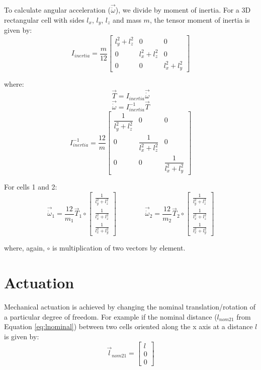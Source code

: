 {To calculate angular acceleration ($\vec{\dot{\omega}}$), we divide by moment of inertia.  For a 3D rectangular cell with sides $l_x$, $l_y$, $l_z$ and mass $m$, the tensor moment of inertia is given by:
\[ I_{inertia} = \dfrac{m}{12} \left[ \begin{array}{ccc}
l_y^2+l_z^2 & 0 & 0\\
0 & l_x^2+l_z^2 & 0\\
0 & 0 & l_x^2+l_y^2
 \end{array} \right] \]
 
 where:
 \[ \vec{T} = I_{inertia}\vec{\dot{\omega}} \]
  \[ \vec{\dot{\omega}}  = I_{inertia}^{-1}\vec{T} \]
  \[ I_{inertia}^{-1} = \dfrac{12}{m} \left[ \begin{array}{ccc}
\dfrac{1}{l_y^2+l_z^2} & 0 & 0\\
0 & \dfrac{1}{l_x^2+l_z^2} & 0\\
0 & 0 & \dfrac{1}{l_x^2+l_y^2}
 \end{array} \right] \]
 
For cells 1 and 2:
 \[ \vec{\dot{\omega}}_1 = \dfrac{12}{m_1} \vec{T}_1 \circ 
 \left[ \begin{smallmatrix}
\tfrac{1}{l_y^2+l_z^2}\\
\tfrac{1}{l_x^2+l_z^2}\\
\tfrac{1}{l_x^2+l_y^2}
 \end{smallmatrix} \right] 
  \qquad\qquad
   \vec{\dot{\omega}}_2 = \dfrac{12}{m_2} \vec{T}_2 \circ
   \left[ \begin{smallmatrix}
\tfrac{1}{l_y^2+l_z^2}\\
\tfrac{1}{l_x^2+l_z^2}\\
\tfrac{1}{l_x^2+l_y^2}
 \end{smallmatrix} \right] 
  \]
  
  where, again, $\circ$ is multiplication of two vectors by element.

\section{Actuation}

Mechanical actuation is achieved by changing the nominal translation/rotation of a particular degree of freedom.  For example if the nominal distance ($l_{nom21}$ from Equation \ref{eq:lnominal}) between two cells oriented along the x axis at a distance $l$ is given by:
\[ \vec{l}_{nom21} =  \left[ \begin{array}{ccc}
l\\
0\\
0
 \end{array} \right] \]
 
}
